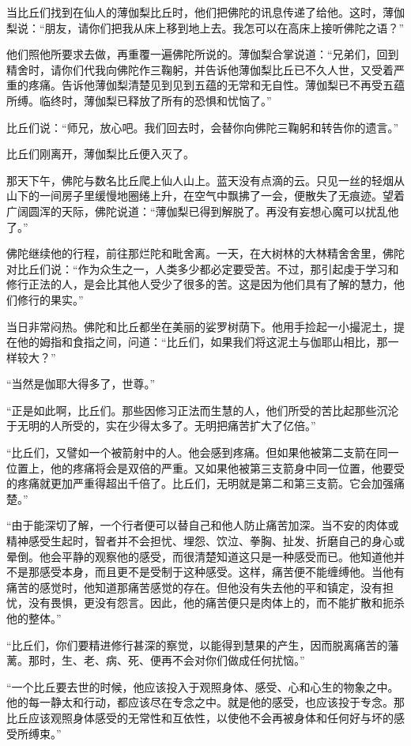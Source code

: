 \documentclass[12pt,twoside,openany]{book}
\begin{document}
当比丘们找到在仙人的薄伽梨比丘时，他们把佛陀的讯息传递了给他。这时，薄伽梨说：“朋友，请你们把我从床上移到地上去。我怎可以在高床上接听佛陀之语？”

他们照他所要求去做，再重覆一遍佛陀所说的。薄伽梨合掌说道：“兄弟们，回到精舍时，请你们代我向佛陀作三鞠躬，并告诉他薄伽梨比丘已不久人世，又受着严重的疼痛。告诉他薄伽梨清楚见到见到五蕴的无常和无自性。薄伽梨已不再受五蕴所缚。临终时，薄伽梨已释放了所有的恐惧和忧恼了。”

比丘们说：“师兄，放心吧。我们回去时，会替你向佛陀三鞠躬和转告你的遗言。”

比丘们刚离开，薄伽梨比丘便入灭了。

那天下午，佛陀与数名比丘爬上仙人山上。蓝天没有点滴的云。只见一丝的轻烟从山下的一间房子里缓慢地圈绻上升，在空气中飘拂了一会，便散失了无痕迹。望着广阔圆浑的天际，佛陀说道：“薄伽梨已得到解脱了。再没有妄想心魔可以扰乱他了。”

佛陀继续他的行程，前往那烂陀和毗舍离。一天，在大树林的大林精舍舍里，佛陀对比丘们说：“作为众生之一，人类多少都必定要受苦。不过，那引起虔于学习和修行正法的人，是会比其他人受少了很多的苦。这是因为他们具有了解的慧力，他们修行的果实。”

当日非常闷热。佛陀和比丘都坐在美丽的娑罗树荫下。他用手捡起一小撮泥土，提在他的姆指和食指之间，问道：“比丘们，如果我们将这泥土与伽耶山相比，那一样较大？”

“当然是伽耶大得多了，世尊。”

“正是如此啊，比丘们。那些因修习正法而生慧的人，他们所受的苦比起那些沉沦于无明的人所受的，实在少得太多了。无明把痛苦扩大了亿倍。”

“比丘们，又譬如一个被箭射中的人。他会感到疼痛。但如果他被第二支箭在同一位置上，他的疼痛将会是双倍的严重。又如果他被第三支箭身中同一位置，他要受的疼痛就更加严重得超出千倍了。比丘们，无明就是第二和第三支箭。它会加强痛楚。”

“由于能深切了解，一个行者便可以替自己和他人防止痛苦加深。当不安的肉体或精神感受生起时，智者并不会担忧、埋怨、饮泣、拳胸、扯发、折磨自己的身心或晕倒。他会平静的观察他的感受，而很清楚知道这只是一种感受而已。他知道他并不是那感受本身，而且更不是受制于这种感受。这样，痛苦便不能缠缚他。当他有痛苦的感觉时，他知道那痛苦感觉的存在。但他没有失去他的平和镇定，没有担忧，没有畏惧，更没有怨言。因此，他的痛苦便只是肉体上的，而不能扩散和扼杀他的整体。”

“比丘们，你们要精进修行甚深的察觉，以能得到慧果的产生，因而脱离痛苦的藩蓠。那时，生、老、病、死、便再不会对你们做成任何扰恼。”

“一个比丘要去世的时候，他应该投入于观照身体、感受、心和心生的物象之中。他的每一静太和行动，都应该尽在专念之中。就是他的感受，也应该投于专念。那比丘应该观照身体感受的无常性和互依性，以使他不会再被身体和任何好与坏的感受所缚束。”
\end{document}
